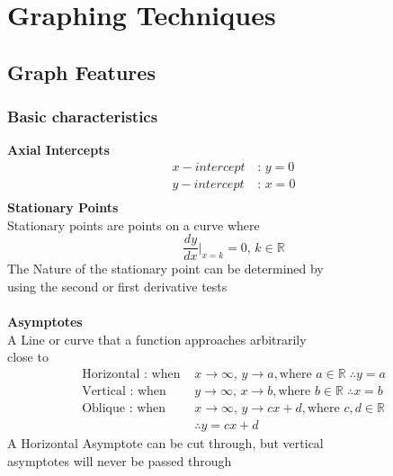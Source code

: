 \documentclass[../main.tex]{subfiles}
\begin{document}
\section{Graphing Techniques}

\subsection{Graph Features}
\subsubsection{Basic characteristics}
\textbf{Axial Intercepts}
\begin{align*}
    x-intercept \, &: \, y=0 \\
    y-intercept \, &: \, x=0 \\
\end{align*}
\textbf{Stationary Points} \\
Stationary points are points on a curve where \\
\[\frac{dy}{dx}\bigg|_{x=k}=0, \, k \in \mathbb{R}\]
The Nature of the stationary point can be determined by \\
using the second or first derivative tests \\\\
\textbf{Asymptotes} \\
A Line or curve that a function approaches arbitrarily \\
close to
\begin{align*}
    \text{Horizontal : when } &x \to \infty, \, y \to a, \text{where } a \in \mathbb{R} \; \therefore y=a \\
    \text{Vertical : when } &y \to \infty, \, x \to b, \text{where } b \in \mathbb{R} \; \therefore x=b  \\
    \text{Oblique : when } &x \to \infty, \, y \to cx+d, \text{where } c,d \in \mathbb{R} \\
                           &\therefore y=cx+d
\end{align*}
A Horizontal Asymptote can be cut through, but vertical \\
asymptotes will never be passed through
\end{document}
